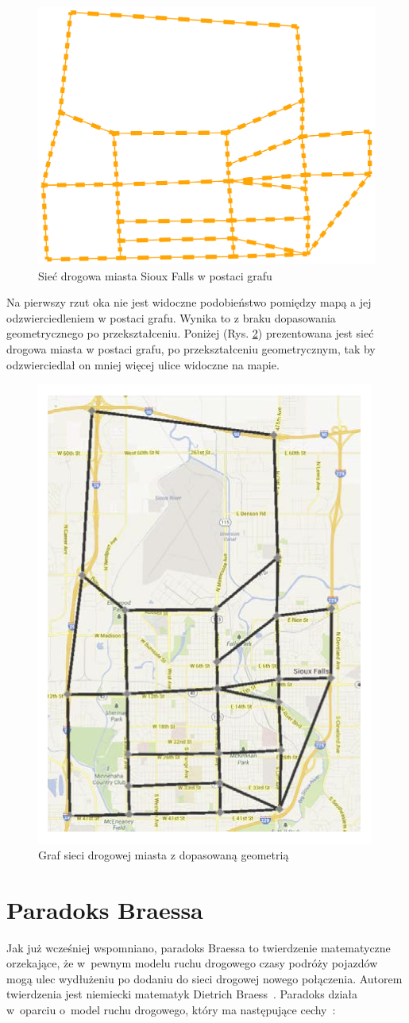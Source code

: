 \documentclass[twoside,12pt]{report}
\begin{document}
\begin{figure}[ht]
	\centering
	\includegraphics[width=0.45\linewidth]{img/graf}
	\caption{Sieć drogowa miasta Sioux Falls w postaci grafu}
	\label{fig:siouxfalls_ex_graf}
\end{figure}

Na pierwszy rzut oka nie jest widoczne podobieństwo pomiędzy mapą a jej odzwierciedleniem w postaci grafu. Wynika to z braku dopasowania geometrycznego po przekształceniu. Poniżej (Rys. \ref{fig:siouxfalls_ex_graf_geometry}) prezentowana jest sieć drogowa miasta w postaci grafu, po przekształceniu geometrycznym, tak by odzwierciedlał on mniej więcej ulice widoczne na mapie.

\begin{figure}[ht]
	\centering
	\includegraphics[width=0.4\linewidth]{img/dopasowanie}
	\caption{Graf sieci drogowej miasta z dopasowaną geometrią}
	\label{fig:siouxfalls_ex_graf_geometry}
\end{figure}

\section{Paradoks Braessa}

Jak już wcześniej wspomniano, paradoks Braessa to twierdzenie matematyczne orzekające, że w~pewnym modelu ruchu drogowego czasy podróży pojazdów mogą ulec wydłużeniu po dodaniu do sieci drogowej nowego połączenia. Autorem twierdzenia jest niemiecki matematyk Dietrich Braess~\cite{braess}. Paradoks działa w~oparciu o~model ruchu drogowego, który ma następujące cechy~\cite{paradox}:
\end{document}
